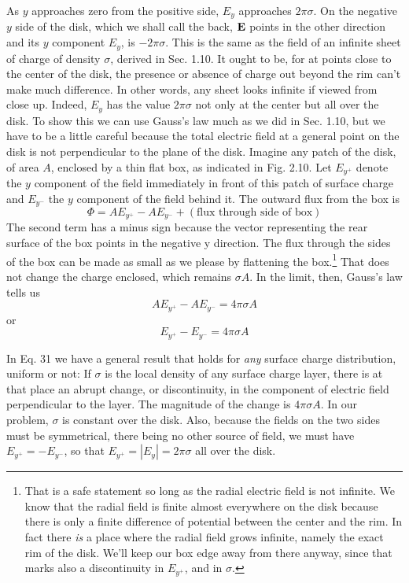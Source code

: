 As $y$ approaches zero from the positive side, $E_y$ approaches $2\pi\sigma$.
On the negative $y$ side of the disk, which we shall call the back, $\mathbf{E}$
points in the other direction and its $y$ component $E_y$, is $-2\pi\sigma$. This
is the same as the field of an infinite sheet of charge of density $\sigma$,
derived in Sec. 1.10. It ought to be, for at points close to the center
of the disk, the presence or absence of charge out beyond the rim
can't make much difference. In other words, any sheet looks infinite
if viewed from close up. Indeed, $E_y$ has the value $2\pi\sigma$ not only at the
center but all over the disk. To show this we can use Gauss's law
much as we did in Sec. 1.10, but we have to be a little careful because
the total electric field at a general point on the disk is not perpendicular
to the plane of the disk. Imagine any patch of the disk, of
area $A$, enclosed by a thin flat box, as indicated in Fig. 2.10. Let $E_{y^+}$
denote the $y$ component of the field immediately in front of this patch
of surface charge and $E_{y^-}$ the $y$ component of the field behind it. The
outward flux from the box is
\begin{equation}
  \Phi = AE_{y^+}-AE_{y^-} + (\text{flux through side of box})
\end{equation}
The second term has a minus sign because the vector representing the
rear surface of the box points in the negative y direction. The flux
through the sides of the box can be made as small as we please by
flattening the box.\footnote{That is a safe statement
so long as the radial electric field is not infinite. We know
that the radial field is finite almost everywhere on the disk because there is only a finite
difference of potential between the center and the rim. In fact there \emph{is} a place where
the radial field grows infinite, namely the exact rim of the disk. We'll keep our box
edge away from there anyway, since that marks also a discontinuity in $E_{y^+}$, and in $\sigma$.}
That does not change the charge enclosed, which
remains $\sigma A$. In the limit, then, Gauss's law tells us
\begin{equation}
  AE_{y^+}-AE_{y^-} = 4\pi\sigma A
\end{equation}
or
\begin{equation}
  E_{y^+}-E_{y^-} = 4\pi\sigma A
\end{equation}

In Eq. 31 we have a general result that holds for \emph{any} surface charge
distribution, uniform or not: If $\sigma$ is the local density of any surface
charge layer, there is at that place an abrupt change, or discontinuity,
in the component of electric field perpendicular to the layer. The
magnitude of the change is $4\pi\sigma A$. In our problem, $\sigma$ is constant over
the disk. Also, because the fields on the two sides must be
symmetrical, there being no other source of field, we must have
$E_{y^+}=-E_{y^-}$, so that $E_{y^+}= |E_y| = 2\pi\sigma$ all over the disk.

